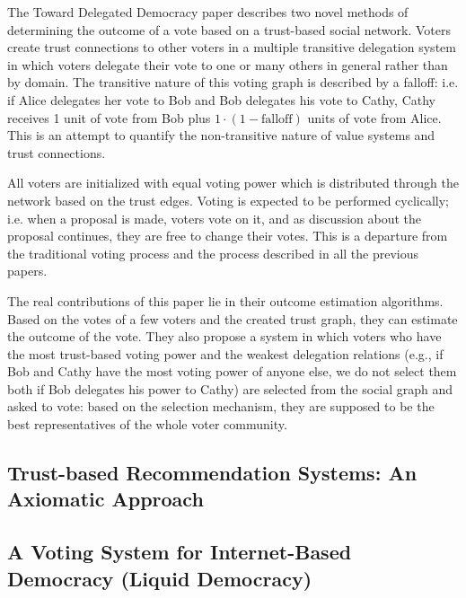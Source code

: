 \documentclass[a4paper]{acm_proc_article-sp}
\begin{document}
The Toward Delegated Democracy paper describes two novel methods of determining the outcome of a vote based on a trust-based
social network.  Voters create trust connections to other voters in a multiple transitive delegation system in which voters
delegate their vote to one or many others in general rather than by domain.  The transitive nature of this voting graph is
described by a falloff: i.e. if Alice delegates her vote to Bob and Bob delegates his vote to Cathy, Cathy receives 1 unit of
vote from Bob plus $1 \cdot (1-\mathrm{falloff})$ units of vote from Alice.  This is an attempt to quantify the non-transitive
nature of value systems and trust connections.

All voters are initialized with equal voting power which is distributed through the network based on the trust edges.  Voting
is expected to be performed cyclically; i.e. when a proposal is made, voters vote on it, and as discussion about the proposal
continues, they are free to change their votes.  This is a departure from the traditional voting process and the process
described in all the previous papers.

The real contributions of this paper lie in their outcome estimation algorithms.  Based on the votes of a few voters and the
created trust graph, they can estimate the outcome of the vote.  They also propose a system in which voters who have the most
trust-based voting power and the weakest delegation relations (e.g., if Bob and Cathy have the most voting power of anyone else,
we do not select them both if Bob delegates his power to Cathy) are selected from the social graph and asked to vote: based on
the selection mechanism, they are supposed to be the best representatives of the whole voter community.

\subsection{Trust-based Recommendation Systems: An Axiomatic Approach}


\subsection{A Voting System for Internet-Based Democracy (Liquid Democracy)}
\end{document}

